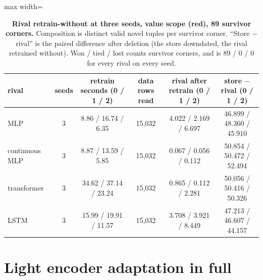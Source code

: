 \documentclass{article} %
\begin{document}
\begin{table}[h]
\centering\small
\caption{\textbf{Rival retrain-without at three seeds, value scope (red), 89 survivor corners.} %
Composition is distinct valid novel tuples per survivor corner. ``Store $-$ rival'' is the paired
difference after deletion (the store downdated, the rival retrained without). Won / tied / lost
counts survivor corners, and is 89 / 0 / 0 for every rival on every seed.} %
\label{tab:rivals-del-seeds}
\setlength{\tabcolsep}{3pt}
\begin{adjustbox}{max width=\linewidth}\begin{tabular}{lccccc}
\toprule
rival & seeds & retrain seconds (0 / 1 / 2) & data rows read & rival after retrain (0 / 1 / 2) & store $-$ rival (0 / 1 / 2) \\
\midrule
MLP & 3 & 8.86 / 16.74 / 6.35 & 15,032 & 4.022 / 2.169 / 6.697 & 46.899 / 48.360 / 45.910 \\
continuous MLP & 3 & 8.87 / 13.59 / 5.85 & 15,032 & 0.067 / 0.056 / 0.112 & 50.854 / 50.472 / 52.494 \\
transformer & 3 & 34.62 / 37.14 / 23.24 & 15,032 & 0.865 / 0.112 / 2.281 & 50.056 / 50.416 / 50.326 \\
LSTM & 3 & 15.99 / 19.91 / 11.57 & 15,032 & 3.708 / 3.921 / 8.449 & 47.213 / 46.607 / 44.157 \\
\bottomrule
\end{tabular}\end{adjustbox}
\end{table}

\section{Light encoder adaptation in full}
\label{app:adapt}
\end{document}
